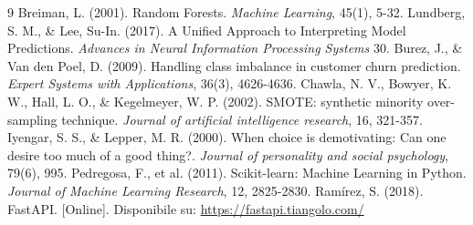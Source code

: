 \documentclass[11pt,a4paper]{article}
\begin{document}
\renewcommand\refname{Riferimenti bibliografici}
\begin{thebibliography}{9}
     Breiman, L. (2001). Random Forests. \textit{Machine Learning}, 45(1), 5-32.
     Lundberg, S. M., \& Lee, Su-In. (2017). A Unified Approach to Interpreting Model Predictions. \textit{Advances in Neural Information Processing Systems} 30.
     Burez, J., \& Van den Poel, D. (2009). Handling class imbalance in customer churn prediction. \textit{Expert Systems with Applications}, 36(3), 4626-4636.
     Chawla, N. V., Bowyer, K. W., Hall, L. O., \& Kegelmeyer, W. P. (2002). SMOTE: synthetic minority over-sampling technique. \textit{Journal of artificial intelligence research}, 16, 321-357.
     Iyengar, S. S., \& Lepper, M. R. (2000). When choice is demotivating: Can one desire too much of a good thing?. \textit{Journal of personality and social psychology}, 79(6), 995.
     Pedregosa, F., et al. (2011). Scikit-learn: Machine Learning in Python. \textit{Journal of Machine Learning Research}, 12, 2825-2830.
     Ramírez, S. (2018). FastAPI. [Online]. Disponibile su: \url{https://fastapi.tiangolo.com/}
\end{thebibliography}
\end{document}

